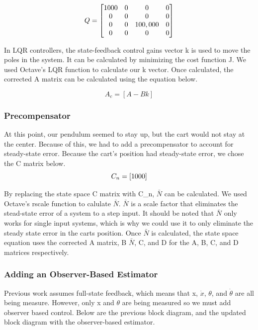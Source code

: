 \documentclass{article}
\begin{document}
 \begin{equation} 
\label{q}
\centering
Q = \begin{bmatrix}
	1000&0&0&0\\
	0&0&0&0\\
	0&0&100,000&0\\
	0&0&0&0\\
	\end{bmatrix}
\end{equation}

In LQR controllers, the state-feedback control gains vector k is used to move the poles in the system. It can be calculated by minimizing the cost function J. We used Octave's LQR function to calculate our k vector. Once calculated, the corrected A matrix can be calculated using the equation below.

\begin{equation}
\label{ac}
A_c=[A-Bk]
\end{equation}

\subsubsection{Precompensator}
At this point, our pendulum seemed to stay up, but the cart would not stay at the center. Because of this, we had to add a precompensator to account for steady-state error. Because the cart's position had steady-state error, we chose the C matrix below.
\\

\begin{equation}
\label{pcomp}
\centering
C_n = [1 0 0 0]
\end{equation}
 
 By replacing the state space C matrix with C\_n, $\bar{N}$ can be calculated. We used Octave's rscale function to calulate $\bar{N}$. $\bar{N}$ is a scale factor that eliminates the stead-state error of a system to a step input. It should be noted that $\bar{N}$ only works for single input systems, which is why we could use it to only eliminate the steady state error in the carts position. Once $\bar{N}$ is calculated, the state space equation uses the corrected A matrix, B $\bar{N}$, C, and D for the A, B, C, and D matrices respectively.
 
 \subsubsection{Adding an Observer-Based Estimator}
 Previous work assumes full-state feedback, which means that x, $\dot{x}$, $\theta$, and $\dot{\theta}$ are all being measure. However, only x and $\theta$ are being measured so we must add observer based control. Below are the previous block diagram, and the updated block diagram with the observer-based estimator.
\end{document}
